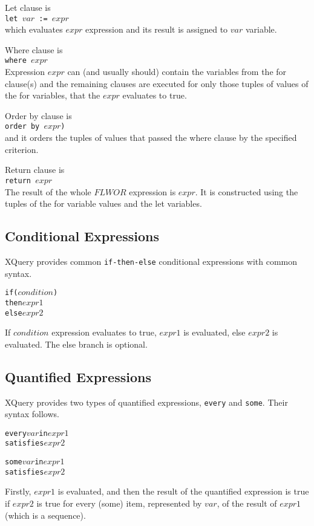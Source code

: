 Let clause is \\
\texttt{let $var$ := $expr$} \\
which evaluates $expr$ expression and its result is assigned to $var$ variable.

Where clause is \\
\texttt{where $expr$} \\
Expression $expr$ can (and usually should) contain the variables from the for clause(s) and the remaining clauses are executed for only those tuples of values of the for variables, that the $expr$ evaluates to true.

Order by clause is \\
\texttt{order by $expr$)} \\
and it orders the tuples of values that passed the where clause by the specified criterion.

Return clause is \\
\texttt{return $expr$} \\
The result of the whole $FLWOR$ expression is $expr$. It is constructed using the tuples of the for variable values and the let variables.

\subsection{Conditional Expressions}
XQuery provides common \texttt{if-then-else} conditional expressions with common syntax.
\begin{alltt}
if (\(condition\))
then \(expr1\)
else \(expr2\)
\end{alltt}
If $condition$ expression evaluates to true, $expr1$ is evaluated, else $expr2$ is evaluated. The else branch is optional.

\subsection{Quantified Expressions}
XQuery provides two types of quantified expressions, \texttt{every} and \texttt{some}. Their syntax follows.
\begin{alltt}
every \(var\) in \(expr1\)
satisfies \(expr2\)
\end{alltt}
\begin{alltt}
some \(var\) in \(expr1\)
satisfies \(expr2\)
\end{alltt}

Firstly, $expr1$ is evaluated, and then the result of the quantified expression is true if $expr2$ is true for every (some) item, represented by $var$, of the result of $expr1$ (which is a sequence). 

